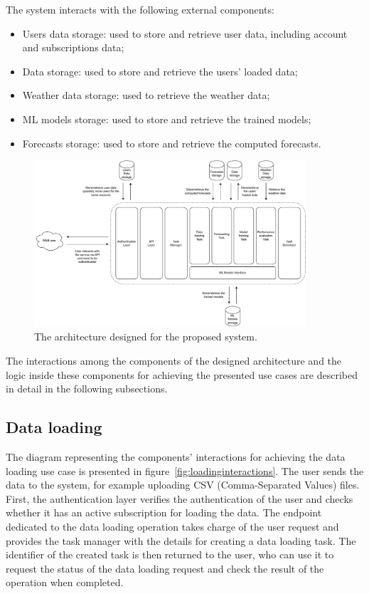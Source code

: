 The system interacts with the following external components:
\begin{itemize}
  \item Users data storage: used to store and retrieve user data, including account and subscriptions data;
  \item Data storage: used to store and retrieve the users' loaded data;
  \item Weather data storage: used to retrieve the weather data;
  \item ML models storage: used to store and retrieve the trained models;
  \item Forecasts storage: used to store and retrieve the computed forecasts.
\end{itemize}

\begin{figure}[H]
\centering
\includegraphics[width=0.9\textwidth]{images/architecture_components}
\caption{The architecture designed for the proposed system.}
\label{fig:components}
\end{figure}

The interactions among the components of the designed architecture and the logic inside these components for achieving the presented use cases are described in detail in the following subsections.


\vspace{0.1 cm}
\subsection{Data loading}
\label{sec:loading}
\vspace{0.1 cm}

The diagram representing the components' interactions for achieving the data loading use case is presented in figure~\ref{fig:loadinginteractions}.
The user sends the data to the system, for example uploading CSV (Comma-Separated Values) files.
First, the authentication layer verifies the authentication of the user and checks whether it has an active subscription for loading the data.
The endpoint dedicated to the data loading operation takes charge of the user request and provides the task manager with the details for creating a data loading task.
The identifier of the created task is then returned to the user, who can use it to request the status of the data loading request and check the result of the operation when completed.

